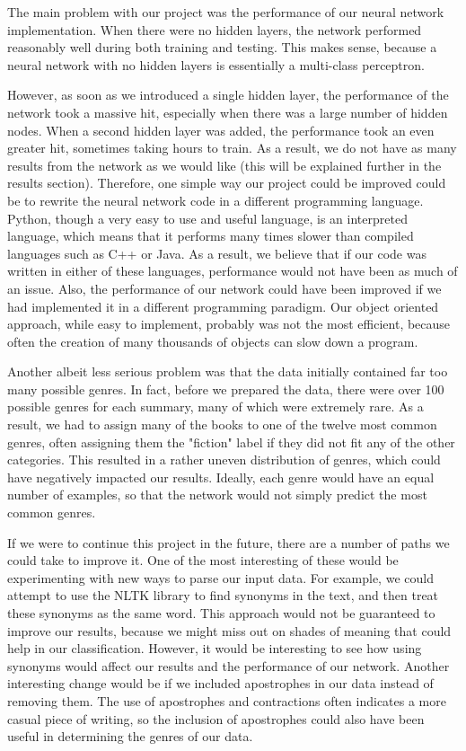 \documentclass[11pt,letterpaper]{article}
\begin{document}
The main problem with our project was the performance of our neural network implementation. When there were no hidden layers, the network performed reasonably well during both training and testing. This makes sense, because a neural network with no hidden layers is essentially a multi-class perceptron.

However, as soon as we introduced a single hidden layer, the performance of the network took a massive hit, especially when there was a large number of hidden nodes. When a second hidden layer was added, the performance took an even greater hit, sometimes taking hours to train. As a result, we do not have as many results from the network as we would like (this will be explained further in the results section). Therefore, one simple way our project could be improved could be to rewrite the neural network code in a different programming language. Python, though a very easy to use and useful language, is an interpreted language, which means that it performs many times slower than compiled languages such as C++ or Java. As a result, we believe that if our code was written in either of these languages, performance would not have been as much of an issue.
Also, the performance of our network could have been improved if we had implemented it in a different programming paradigm. Our object oriented approach, while easy to implement, probably was not the most efficient, because often the creation of many thousands of objects can slow down a program.

Another albeit less serious problem was that the data initially contained far too many possible genres. In fact, before we prepared the data, there were over 100 possible genres for each summary, many of which were extremely rare. As a result, we had to assign many of the books to one of the twelve most common genres, often assigning them the "fiction" label if they did not fit any of the other categories. This resulted in a rather uneven distribution of genres, which could have negatively impacted our results. Ideally, each genre would have an equal number of examples, so that the network would not simply predict the most common genres.

If we were to continue this project in the future, there are a number of paths we could take to improve it. One of the most interesting of these would be experimenting with new ways to parse our input data. For example, we could attempt to use the NLTK library to find synonyms in the text, and then treat these synonyms as the same word. This approach would not be guaranteed to improve our results, because we might miss out on shades of meaning that could help in our classification. However, it would be interesting to see how using synonyms would affect our results and the performance of our network. Another interesting change would be if we included apostrophes in our data instead of removing them. The use of apostrophes and contractions often indicates a more casual piece of writing, so the inclusion of apostrophes could also have been useful in determining the genres of our data.
\end{document}
